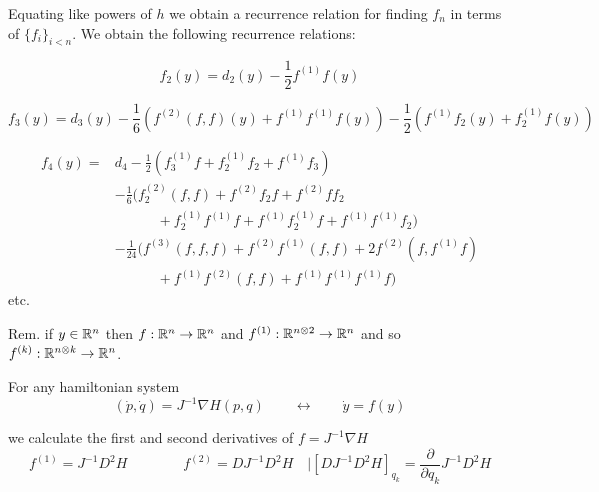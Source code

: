 \documentclass[12pt]{article}
\begin{document}
Equating like powers of $h$ we obtain a recurrence relation for finding $f_n$ in terms of $\{f_i\}_{i<n}$. We obtain the following recurrence relations:

\begin{equation}\label{eq:f_2}
    f_2(y) = d_2(y) - \frac{1}{2} f^{(1)} f(y)
\end{equation}

\begin{equation}\label{eq:f_3}
    f_3(y) = d_3(y) - \frac{1}{6}\left( f^{(2)} (f , f)(y) + f^{(1)} f^{(1)} f(y) \right) - \frac{1}{2}\left( f^{(1)} f_2(y) + f_2^{(1)}  f(y) \right)
\end{equation}

\begin{equation}\label{eq:f_4}
\begin{split}
    f_4(y) = & d_4 - \frac{1}{2}\left( f_3^{(1)} f + f_2^{(1)} f_2 + f^{(1)} f_3 \right)\\
             & - \frac{1}{6}\Big( f_2^{(2)}(f,f) + f^{(2)}f_2 f + f^{(2)} f f_2\\
             & \qquad\quad + f_2^{(1)} f^{(1)} f + f^{(1)}f_2^{(1)}f + f^{(1)}f^{(1)}f_2
             \Big)\\
             & - \frac{1}{24}\Big(
             f^{(3)}(f,f,f) + f^{(2)}f^{(1)}(f,f) + 2 f^{(2)}(f,f^{(1)}f) \\
             &\qquad\quad + f^{(1)}f^{(2)}(f,f) + f^{(1)}f^{(1)}f^{(1)}f
             \Big)
\end{split}
\end{equation}
etc.

Rem. if $y\in\mathbb{R}^n$ then $f:\mathbb{R}^n \to \mathbb{R}^n$ and $f^{(1)}:\mathbb{R}^{n \otimes 2}\to\mathbb{R}^n$ and so $f^{(k)} : \mathbb{R}^{n\otimes k}\to\mathbb{R}^n$. 

For any hamiltonian system 
\begin{equation}\label{eq:hamiltonian system ode}
    (\dot p,\dot q) = J^{-1}\nabla H(p,q) \qquad \leftrightarrow \qquad \dot y = f(y)
\end{equation}

we calculate the first and second derivatives of $f = J^{-1}\nabla H$
\begin{equation}\label{eq:first and second derivatives of gradient hamiltonian}
    f^{(1)} = J^{-1}D^2 H \qquad\qquad f^{(2)} = D J^{-1}D^2 H\quad \Big| \left[ DJ^{-1}D^2H \right]_{q_k} = \frac{\partial}{\partial q_k} J^{-1}D^2H
\end{equation}
\end{document}
